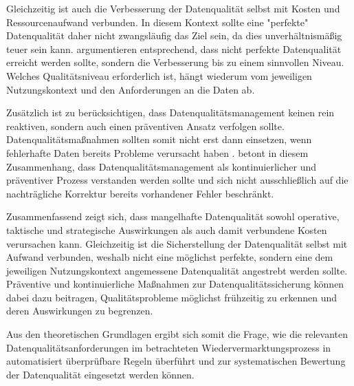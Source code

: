 \documentclass[../main.tex]{subfiles}
\begin{document}
Gleichzeitig ist auch die Verbesserung der Datenqualität selbst mit Kosten und Ressourcenaufwand verbunden. In diesem Kontext sollte eine "perfekte" Datenqualität daher nicht zwangsläufig das Ziel sein, da dies unverhältnismäßig teuer sein kann. \textcite{haugCostsPoorData2011} argumentieren entsprechend, dass nicht perfekte Datenqualität erreicht werden sollte, sondern die Verbesserung bis zu einem sinnvollen Niveau. Welches Qualitätsniveau erforderlich ist, hängt wiederum vom jeweiligen Nutzungskontext und den Anforderungen an die Daten ab.

Zusätzlich ist zu berücksichtigen, dass Datenqualitätsmanagement keinen rein reaktiven, sondern auch einen präventiven Ansatz verfolgen sollte. Datenqualitätsmaßnahmen sollten somit nicht erst dann einsetzen, wenn fehlerhafte Daten bereits Probleme verursacht haben \parencite{marshDrowningDirtyData2005}. \textcite{marshDrowningDirtyData2005} betont in diesem Zusammenhang, dass Datenqualitätsmanagement als kontinuierlicher und präventiver Prozess verstanden werden sollte und sich nicht ausschließlich auf die nachträgliche Korrektur bereits vorhandener Fehler beschränkt.

Zusammenfassend zeigt sich, dass mangelhafte Datenqualität sowohl operative, taktische und strategische Auswirkungen als auch damit verbundene Kosten verursachen kann. Gleichzeitig ist die Sicherstellung der Datenqualität selbst mit Aufwand verbunden, weshalb nicht eine möglichst perfekte, sondern eine dem jeweiligen Nutzungskontext angemessene Datenqualität angestrebt werden sollte. Präventive und kontinuierliche Maßnahmen zur Datenqualitätssicherung können dabei dazu beitragen, Qualitätsprobleme möglichst frühzeitig zu erkennen und deren Auswirkungen zu begrenzen.

Aus den theoretischen Grundlagen ergibt sich somit die Frage, wie die relevanten Datenqualitätsanforderungen im betrachteten Wiedervermarktungsprozess in automatisiert überprüfbare Regeln überführt und zur systematischen Bewertung der Datenqualität eingesetzt werden können.
\end{document}
